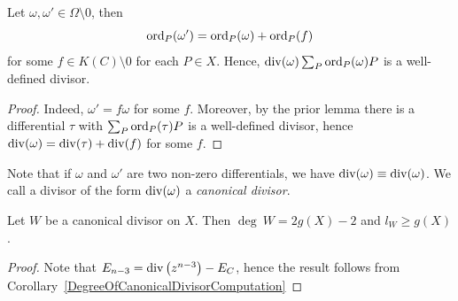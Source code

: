     \begin{lemma}
        Let $\omega,\omega'\in \Omega\setminus 0$, then 
        $$
            \mathrm{ord}_P(\omega') = \mathrm{ord}_P(\omega)+\mathrm{ord}_P(f)
        $$ 
        for some $f\in K(C)\setminus 0$ for each $P\in X$. Hence, $\mathrm{div}(\omega)\sum_P \mathrm{ord}_P(\omega) P$ is a well-defined divisor.  
    \end{lemma}
    \begin{proof}
        Indeed, $\omega' = f\omega$ for some $f$. Moreover, by the prior lemma there is a differential $\tau$ with $\sum_P \mathrm{ord}_P(\tau) P$ is a well-defined divisor, hence $\mathrm{div}(\omega) = \mathrm{div}(\tau)+ \mathrm{div}(f)$ for some $f$. 
    \end{proof}
    \begin{remark}
        Note that if $\omega$ and $\omega'$ are two non-zero differentials, we have $\mathrm{div}(\omega) \equiv \mathrm{div}(\omega)$. We call a divisor of the form $\mathrm{div}(\omega)$ a \emph{canonical divisor}. 
    \end{remark}
    \begin{corollary}
        Let $W$ be a canonical divisor on $X$. Then $\deg \ W = 2g(X)-2$ and $l_W \geq g(X)$. 
    \end{corollary}
    \begin{proof}
        Note that $E_{n-3} = \mathrm{div}\left(z^{n-3}\right)-E_C$, hence the result follows from Corollary~\ref{DegreeOfCanonicalDivisorComputation}
    \end{proof}
